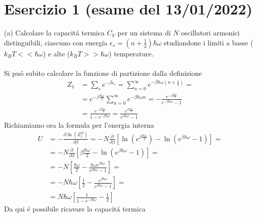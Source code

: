 \documentclass[a4paper]{article}
\begin{document}
    \section*{Esercizio 1 (esame del 13/01/2022)}
        (a) Calcolare la capacit\'a termica $C_V$ per un sistema di $N$ oscillatori armonici distinguibili, ciascuno con energia $\epsilon_s=\left(n+\frac{1}{2}\right)\hbar\omega$ studiandone i limiti a basse ($k_BT<<\hbar\omega$) e alte ($k_BT>>\hbar\omega$) temperature.
        \\
        \\
        Si pu\'o subito calcolare la funzione di partizione dalla definizione
        \begin{equation*}
            \begin{split}
                Z_1&=\sum_se^{-\beta\epsilon_s}=\sum_{n=0}^\infty e^{-\beta\hbar\omega\left(n+\frac{1}{2}\right)}=\\
                &=e^{-\beta\frac{\hbar\omega}{2}}\sum_{n=0}^\infty e^{-\beta\hbar\omega n}=-\frac{e^{-\beta\frac{\hbar\omega}{2}}}{e^{-\beta\hbar\omega}-1}\\
                &=\frac{e^{-\beta\frac{\hbar\omega}{2}}}{1-e^{-\beta\hbar\omega}}=\frac{e^{\beta\frac{\hbar\omega}{2}}}{e^{\beta\hbar\omega}-1}
            \end{split}
        \end{equation*}
        Richiamiamo ora la formula per l'energia interna
        \begin{equation*}
            \begin{split}
                U&=-\frac{\partial\ln(Z_1^N)}{\partial\beta}=-N\frac{\partial}{\partial\beta}\left[\ln(e^{\beta\frac{\hbar\omega}{2}})-\ln(e^{\beta\hbar\omega}-1)\right]=\\
                &=-N\frac{\partial}{\partial\beta}\left[\beta\frac{\hbar\omega}{2}-\ln(e^{\beta\hbar\omega}-1)\right]=\\
                &=-N\left[\frac{\hbar\omega}{2}-\frac{\hbar\omega e^{\beta\hbar\omega}}{e^{\beta\hbar\omega}-1}\right]=\\
                &=-N\hbar\omega\left[\frac{1}{2}-\frac{e^{\beta\hbar\omega}}{e^{\beta\hbar\omega}-1}\right]=\\
                &=N\hbar\omega\left[\frac{1}{1-e^{-\beta\hbar\omega}}-\frac{1}{2}\right]
            \end{split}
        \end{equation*}
        Da qui \'e possibile ricavare la capacit\'a termica
\end{document}
